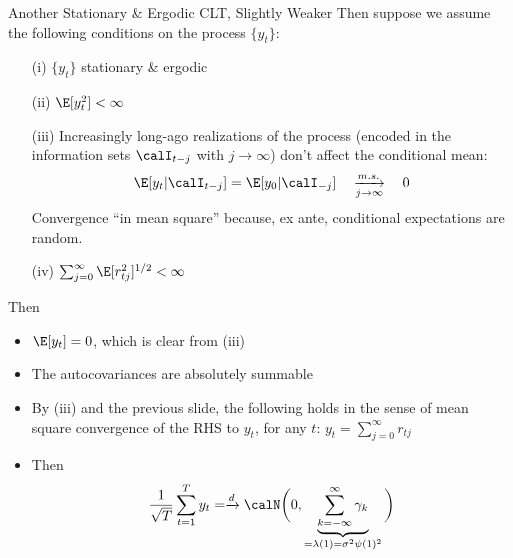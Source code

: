 \documentclass[aspectratio=169, handout]{beamer}
\newcommand{\ra}{\rightarrow}
\newcommand{\msto}{\xrightarrow{m.s.}}
\newcommand{\dto}{\xrightarrow{d}}
\newcommand{\sumtT}{\sum^T_{t=1}}
\begin{document}
{\scriptsize
\begin{frame}{Another Stationary \& Ergodic CLT, Slightly Weaker}
Then suppose we assume the following conditions on the process $\{y_t\}$:
\vspace{-8pt}
\begin{itemize}
  \item[(i)] $\{y_t\}$ stationary \& ergodic
  \item[(ii)] $\E[y_t^2]<\infty$
  \item[(iii)]
    Increasingly long-ago realizations of the process
    (encoded in the information sets $\calI_{t-j}$ with $j\ra\infty$)
    don't affect the conditional mean:
    \begin{align*}
      \E[y_t|\calI_{t-j}]
      =
      \E[y_0|\calI_{-j}]
      \quad\underset{j\ra\infty}{\msto}\quad0
    \end{align*}
    Convergence ``in mean square'' because, ex ante,
    conditional expectations are random.

  \item[(iv)] $\sum_{j=0}^\infty \E[r_{tj}^2]^{1/2}<\infty$
\end{itemize}
\vspace{-8pt}
Then
\vspace{-8pt}
\begin{itemize}
  \item $\E[y_t]=0$, which is clear from (iii)
  \item The autocovariances are absolutely summable
  \item By (iii) and the previous slide, the following holds in the
    sense of mean square convergence of the RHS to $y_t$, for any $t$:
    $y_t = \sum_{j=0}^\infty r_{tj}$
  \item
    Then
    \begin{align*}
      \frac{1}{\sqrt{T}}
      \sumtT
      y_t
      =
      \dto
      \calN\bigg(
        0,
        \underbrace{%
        \sum_{k=-\infty}^\infty \gamma_k
        }_{=\lambda(1)=\sigma^2\psi(1)^2}
      \bigg)
    \end{align*}
\end{itemize}
\end{frame}
}
\end{document}
